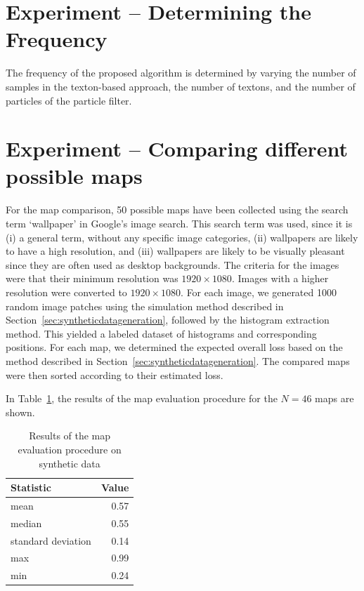 \documentclass{report}
\begin{document}
\section{Experiment -- Determining the Frequency}

The frequency of the proposed algorithm is determined by varying the
number of samples in the texton-based approach, the number of textons,
and the number of particles of the particle filter.

\section{Experiment -- Comparing different possible maps}

For the map comparison, 50 possible maps have been collected using the
search term `wallpaper' in Google's image search. This search term was
used, since it is (i) a general term, without any specific image
categories, (ii) wallpapers are likely to have a high resolution, and
(iii) wallpapers are likely to be visually pleasant since they are
often used as desktop backgrounds. The criteria for the images were
that their minimum resolution was $1920 \times 1080$. Images with a
higher resolution were converted to $1920 \times 1080$.  For each
image, we generated 1000 random image patches using the simulation
method described in Section~\ref{sec:syntheticdatageneration},
followed by the histogram extraction method. This yielded a labeled
dataset of histograms and corresponding positions. For each map, we
determined the expected overall loss based on the method described in
Section~\ref{sec:syntheticdatageneration}. The compared maps were then
sorted according to their estimated loss.



In Table~\ref{tab:mapeval}, the results of the map evaluation
procedure for the $N = 46$ maps are shown.

\begin{table}[h]
  \centering
  \begin{tabular}{lr}
    \toprule
    Statistic & Value\\
    \midrule
    mean & 0.57\\
    median & 0.55\\
    standard deviation & 0.14\\
    max & 0.99\\
    min & 0.24\\    
    \bottomrule
  \end{tabular}
  \caption[Map evaluation procedure on synthetic data]{Results of the map evaluation procedure on synthetic data}
  \label{tab:mapeval}

\end{table}
\end{document}
